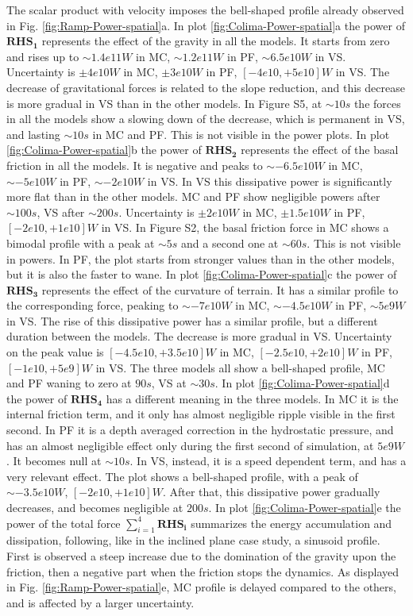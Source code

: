 \documentclass{article}
\begin{document}
The scalar product with velocity imposes the bell-shaped profile already observed in Fig. \ref{fig:Ramp-Power-spatial}a. In plot \ref{fig:Colima-Power-spatial}a the power of $\boldsymbol{RHS_1}$ represents the effect of the gravity in all the models. It starts from zero and rises up to $\sim 1.4e11 W$ in MC, $\sim 1.2e11 W$ in PF, $\sim 6.5e10 W$ in VS. Uncertainty is $\pm 4e10 W$ in MC, $\pm 3e10 W$ in PF, $[-4e10,+5e10] W$ in VS. The decrease of gravitational forces is related to the slope reduction, and this decrease is more gradual in VS than in the other models. In Figure S5, at $\sim 10 s$ the forces in all the models show a slowing down of the decrease, which is permanent in VS, and lasting $\sim 10 s$ in MC and PF. This is not visible in the power plots. In plot \ref{fig:Colima-Power-spatial}b the power of  $\boldsymbol{RHS_2}$ represents the effect of the basal friction in all the models. It is negative and peaks to $\sim -6.5e10 W$ in MC, $\sim -5e10 W$ in PF, $\sim -2e10 W$ in VS. In VS this dissipative power is significantly more flat than in the other models. MC and PF show negligible powers after $\sim 100 s$, VS after $\sim 200 s$. Uncertainty is $\pm 2e10 W$ in MC, $\pm 1.5e10 W$ in PF, $[-2e10,+1e10] W$ in VS. In Figure S2, the basal friction force in MC shows a bimodal profile with a peak at $\sim 5 s$ and a second one at $\sim 60 s$. This is not visible in powers. In PF, the plot starts from stronger values than in the other models, but it is also the faster to wane. In plot \ref{fig:Colima-Power-spatial}c the power of $\boldsymbol{RHS_3}$ represents the effect of the curvature of terrain. It has a similar profile to the corresponding force, peaking to $\sim -7e10 W$ in MC, $\sim -4.5e10 W$ in PF, $\sim 5e9 W$ in VS. The rise of this dissipative power has a similar profile, but a different duration between the models. The decrease is more gradual in VS. Uncertainty on the peak value is $[-4.5e10,+3.5e10] W$ in MC, $[-2.5e10,+2e10] W$ in PF, $[-1e10,+5e9] W$ in VS. The three models all show a bell-shaped profile, MC and PF waning to zero at $90 s$, VS at $\sim 30 s$. In plot \ref{fig:Colima-Power-spatial}d the power of $\boldsymbol{RHS_4}$ has a different meaning in the three models. In MC it is the internal friction term, and it only has almost negligible ripple visible in the first second. In PF it is a depth averaged correction in the hydrostatic pressure, and has an almost negligible effect only during the first second of simulation, at $5e9 W$. It becomes null at $\sim 10 s$. In VS, instead, it is a speed dependent term, and has a very relevant effect. The plot shows a bell-shaped profile, with a peak of $\sim -3.5e10 W$, $[-2e10,+1e10] W$. After that, this dissipative power gradually decreases, and becomes negligible at $200 s$. In plot \ref{fig:Colima-Power-spatial}e the power of the total force $\sum^4_{i=1}\boldsymbol{RHS_i}$ summarizes the energy accumulation and dissipation, following, like in the inclined plane case study, a sinusoid profile. First is observed a steep increase due to the domination of the gravity upon the friction, then a negative part when the friction stops the dynamics. As displayed in Fig. \ref{fig:Ramp-Power-spatial}e, MC profile is delayed compared to the others, and is affected by a larger uncertainty.
\end{document}
